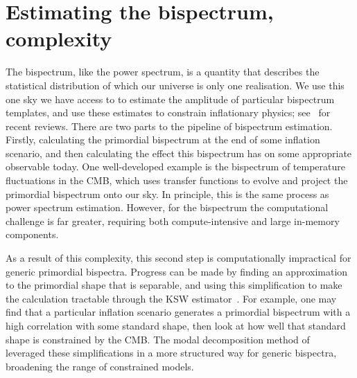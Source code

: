     \section{Estimating the bispectrum, complexity}
    The bispectrum, like the power spectrum, is a quantity that describes
the statistical distribution of which our universe is only one realisation.
We use this one sky we have access to to estimate the amplitude of
particular bispectrum templates,
and use these estimates to constrain inflationary physics; 
see~\cite{astro2020_features,astro2020_png} for recent reviews.
There are two parts to the pipeline of bispectrum estimation.
Firstly, calculating the primordial bispectrum at the end of some inflation scenario,
and then calculating the effect this bispectrum
has on some appropriate observable today.
One well-developed example is
the bispectrum of temperature fluctuations in the CMB, which uses transfer functions
to evolve and project the primordial bispectrum onto our sky.
In principle, this is the same process as power spectrum estimation.
However, for the bispectrum the computational challenge is far greater,
requiring both compute-intensive and large in-memory components.


As a result of this complexity, this second step is computationally impractical for generic primordial bispectra.
Progress can be made by finding an approximation to the primordial shape
that is separable, and using this simplification
to make the calculation tractable
through the KSW estimator~\cite{Komatsu_2005, Munchmeyer_2014}.
For example, one may find that a particular inflation scenario generates
a primordial bispectrum with a high correlation with some standard shape,
then look at how well that standard shape is constrained by the CMB.
The modal decomposition method of~\cite{FergShell_1,FergShell_2,FergShell_3}
leveraged these simplifications in a more structured way
for generic bispectra, broadening the range of constrained models.


